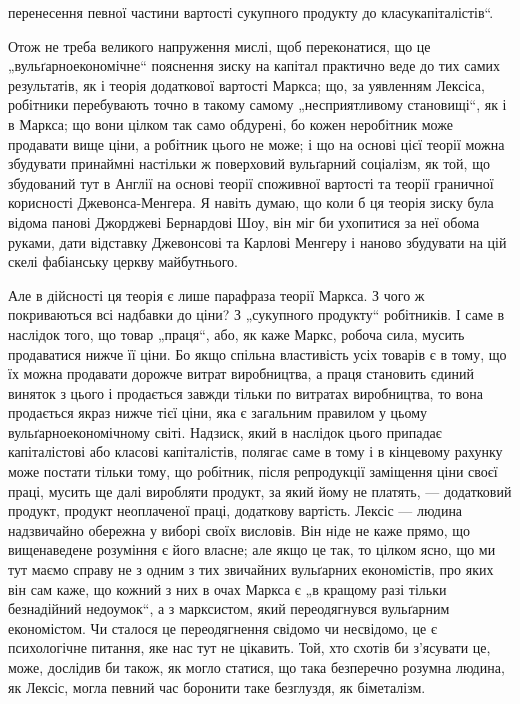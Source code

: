 \parcont{}  %
перенесення певної частини вартості сукупного продукту до
класу\linebreak[4]
капіталістів“.

Отож не треба великого напруження мислі, щоб переконатися,
що це „вульґарноекономічне“ пояснення зиску на капітал
практично веде до тих самих результатів, як і теорія додаткової
вартості Маркса; що, за уявленням Лексіса, робітники
перебувають точно в такому самому „несприятливому становищі“,
як і в Маркса; що вони цілком так само обдурені, бо
кожен неробітник може продавати вище ціни, а робітник цього
не може; і що на основі цієї теорії можна збудувати принаймні
настільки ж поверховий вульґарний соціалізм, як той, що збудований
тут в Англії на основі теорії споживної вартості та
теорії граничної корисності Джевонса-Менгера. Я навіть думаю,
що коли б ця теорія зиску була відома панові Джорджеві Бернардові
Шоу, він міг би ухопитися за неї обома руками, дати
відставку Джевонсові та Карлові Менгеру і наново збудувати
на цій скелі фабіанську церкву майбутнього.

Але в дійсності ця теорія є лише парафраза теорії Маркса.
З чого ж покриваються всі надбавки до ціни? З „сукупного
продукту“ робітників. І саме в наслідок того, що товар „праця“,
або, як каже Маркс, робоча сила, мусить продаватися нижче її
ціни. Бо якщо спільна властивість усіх товарів є в тому, що їх
можна продавати дорожче витрат виробництва, а праця становить
єдиний виняток з цього і продається завжди тільки по витратах
виробництва, то вона продається якраз нижче тієї ціни, яка є
загальним правилом у цьому вульґарноекономічному світі. Надзиск,
який в наслідок цього припадає капіталістові або класові
капіталістів, полягає саме в тому і в кінцевому рахунку може
постати тільки тому, що робітник, після репродукції заміщення
ціни своєї праці, мусить ще далі виробляти продукт, за який
йому не платять, — додатковий продукт, продукт неоплаченої
праці, додаткову вартість. Лексіс — людина надзвичайно обережна
у виборі своїх висловів. Він ніде не каже прямо, що
вищенаведене розуміння є його власне; але якщо це так, то
цілком ясно, що ми тут маємо справу не з одним з тих звичайних
вульґарних економістів, про яких він сам каже, що кожний
з них в очах Маркса є „в кращому разі тільки безнадійний недоумок“,
а з марксистом, який переодягнувся вульґарним економістом.
Чи сталося це переодягнення свідомо чи несвідомо, це
є психологічне питання, яке нас тут не цікавить. Той, хто схотів
би з’ясувати це, може, дослідив би також, як могло статися, що
така безперечно розумна людина, як Лексіс, могла певний час
боронити таке безглуздя, як біметалізм.


